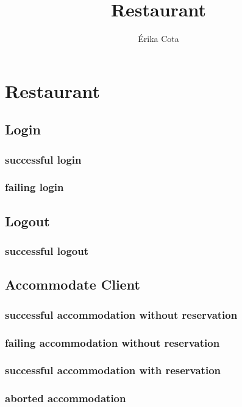 \documentclass[a4paper,11pt,oneside]{book}
\author{Érika Cota}
\title{Restaurant}
\begin{document}
\maketitle
\pagestyle{plain}

\chapter*{Restaurant}

\section{Login}

\subsection{successful login}
\subsection{failing login}

\section{Logout}
\subsection{successful logout}

\section{Accommodate Client}

\subsection{successful accommodation without reservation}
\subsection{failing accommodation without reservation}
\subsection{successful accommodation with reservation}
\subsection{aborted accommodation}
\end{document}
